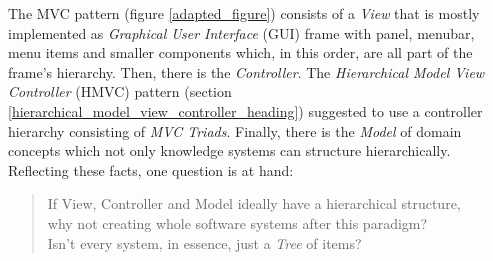 The MVC pattern (figure \ref{adapted_figure}) consists of a \emph{View} that is
mostly implemented as \emph{Graphical User Interface} (GUI) frame with panel,
menubar, menu items and smaller components which, in this order, are all part
of the frame's hierarchy. Then, there is the \emph{Controller}. The
\emph{Hierarchical Model View Controller} (HMVC) pattern (section
\ref{hierarchical_model_view_controller_heading}) suggested to use a controller
hierarchy consisting of \emph{MVC Triads}. Finally, there is the \emph{Model}
of domain concepts which not only knowledge systems can structure
hierarchically. Reflecting these facts, one question is at hand:

\begin{quote}
    If View, Controller and Model ideally have a hierarchical structure,\\
    why not creating whole software systems after this paradigm?\\
    Isn't every system, in essence, just a \emph{Tree} of items?
\end{quote}
